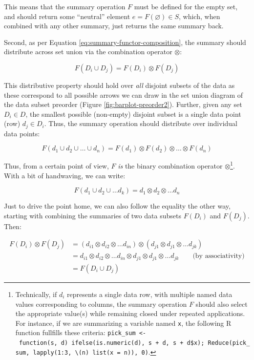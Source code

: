 \documentclass[
]{book}
\theoremstyle{definition}
\theoremstyle{definition}
\theoremstyle{definition}
\theoremstyle{definition}
\theoremstyle{remark}
\begin{document}
This means that the summary operation \(F\) must be defined for the empty set, and should return some ``neutral'' element \(e = F(\varnothing) \in S\), which, when combined with any other summary, just returns the same summary back.

Second, as per Equation \eqref{eq:summary-functor-composition}, the summary should distribute across set union via the combination operator \(\otimes\):

\[F(D_i \cup D_j) = F(D_i) \otimes F(D_j)\]

This distributive property should hold over \emph{all} disjoint subsets of the data as these correspond to all possible arrows we can draw in the set union diagram of the data subset preorder (Figure \ref{fig:barplot-preorder2}). Further, given any set \(D_i \in D\), the smallest possible (non-empty) disjoint subset is a single data point (row) \(d_j \in D_i\). Thus, the summary operation should distribute over individual data points:

\[F(d_1 \cup d_2 \cup \ldots \cup d_n) = F(d_1) \otimes F(d_2) \otimes \ldots \otimes F(d_n)\]

Thus, from a certain point of view, \(F\) \emph{is} the binary combination operator \(\otimes\)\footnote{Technically, if \(d_i\) represents a single data row, with multiple named data values corresponding to columns, the summary operation \(F\) should also select the appropriate value(s) while remaining closed under repeated applications. For instance, if we are summarizing a variable named \texttt{x}, the following R function fullfills these criteria: \texttt{pick\_sum\ \textless{}-\ function(s,\ d)\ ifelse(is.numeric(d),\ s\ +\ d,\ s\ +\ d\$x);\ Reduce(pick\_sum,\ lapply(1:3,\ \textbackslash{}(n)\ list(x\ =\ n)),\ 0)}.}. With a bit of handwaving, we can write:

\[F(d_1 \cup d_2 \cup \ldots d_k) = d_1 \otimes d_2 \otimes \ldots d_n\]

Just to drive the point home, we can also follow the equality the other way, starting with combining the summaries of two data subsets \(F(D_i)\) and \(F(D_j)\). Then:

\begin{align}

F(D_i) \otimes F(D_j) &= (d_{i1} \otimes d_{i2} \otimes \ldots d_{in}) \otimes (d_{j1} \otimes d_{j1} \otimes \ldots d_{jk}) \\
&= d_{i1} \otimes d_{i2} \otimes \ldots d_{in} \otimes d_{j1} \otimes d_{j1} \otimes \ldots d_{jk} \qquad \text{(by associativity)} \\
&= F(D_i \cup D_j)

\end{align}
\end{document}
